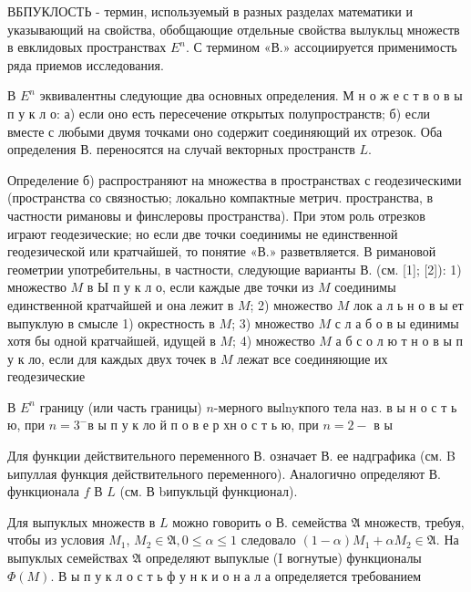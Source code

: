 \documentclass[10pt]{article}
\begin{document}
ВБПУКЛОСТЬ - термин, используемый в разных разделах математики и указывающий на свойства, обобщающие отдельные свойства вылукльц множеств в евклидовых пространствах $E^{n}$. С термином «В.» ассоциируется применимость ряда приемов исследования.



В $E^{n}$ эквивалентны следующие два основных определения. М н о ж е с т в о в ы п у к л о: а) если оно есть пересечение открытых полупространств; б) если вместе с любыми двумя точками оно содержит соединяющий их отрезок. Оба определения В. переносятся на случай векторных пространств $L$.



Определение б) распространяют на множества в пространствах с геодезическими (пространства со связностью; локально компактные метрич. пространства, в частности римановы и финслеровы пространства). При этом роль отрезков играют геодезические; но если две точки соединимы не единственной геодезической или кратчайшей, то понятие «В.» разветвляется. В римановой геометрии употребительны, в частности, следующие варианты В. (см. [1]; [2]): 1) множество $M$ в Ы п у к л о, если каждые две точки из $M$ соединимы единственной кратчайшей и она лежит в $M$; 2) множество $M$ лок а л ь н $о$ в ы ет выпуклую в смысле 1) окрестность в $M$; 3) множество $M$ с л а б о в ы единимы хотя бы одной кратчайшей, идущей в $M$; 4) множество $M$ а б с о л ю т н о в ы п у к ло, если для каждых двух точек в $M$ лежат все соединяющие их геодезические



В $E^{n}$ границу (или часть границы) $n$-мерного выlnyкпого тела наз. в ы н о с т ь ю, при $n=3^{-}$в ы п у к ло й п о в е р хн о с т ь ю, при $n=2-$ в ы



Для функции действительного переменного В. означает В. ее надграфика (см. B ьипуллая функция действительного переменного). Аналогично определяют В. функционала $f$ В $L$ (см. В bипукльцй функционал).



Для выпуклых множеств в $L$ можно говорить о В. семейства $\mathfrak{A}$ множеств, требуя, чтобы из условия $M_{1}$, $M_{2} \in \mathfrak{A}, 0 \leqslant \alpha \leqslant 1$ следовало $(1-\alpha) M_{1}+\alpha M_{2} \in \mathfrak{A}$. На выпуклых семействах $\mathfrak{A}$ определяют выпуклые (I вогнутые) функционалы $\Phi(M)$. В ы п у к л о с т ь ф у н к и о н а л а определяется требованием
\end{document}
